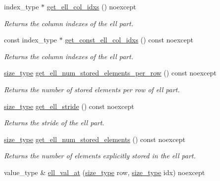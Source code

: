\begin{DoxyCompactItemize}
index\+\_\+type $\ast$ \hyperlink{classgko_1_1matrix_1_1Hybrid_ac46548ef106a6b8fe32219d3e11aab22}{get\+\_\+ell\+\_\+col\+\_\+idxs} () noexcept
\begin{DoxyCompactList}\small\item\em Returns the column indexes of the ell part. \end{DoxyCompactList}\item 
const index\+\_\+type $\ast$ \hyperlink{classgko_1_1matrix_1_1Hybrid_a7cba3bbddd3f2f921b65bcb8cd208df5}{get\+\_\+const\+\_\+ell\+\_\+col\+\_\+idxs} () const noexcept
\begin{DoxyCompactList}\small\item\em Returns the column indexes of the ell part. \end{DoxyCompactList}\item 
\hyperlink{namespacegko_a6e5c95df0ae4e47aab2f604a22d98ee7}{size\+\_\+type} \hyperlink{classgko_1_1matrix_1_1Hybrid_a9ac6d0efc8627c915c73a0155e64548d}{get\+\_\+ell\+\_\+num\+\_\+stored\+\_\+elements\+\_\+per\+\_\+row} () const noexcept
\begin{DoxyCompactList}\small\item\em Returns the number of stored elements per row of ell part. \end{DoxyCompactList}\item 
\hyperlink{namespacegko_a6e5c95df0ae4e47aab2f604a22d98ee7}{size\+\_\+type} \hyperlink{classgko_1_1matrix_1_1Hybrid_a2472495b537b47555a04aa6ba11d5817}{get\+\_\+ell\+\_\+stride} () const noexcept
\begin{DoxyCompactList}\small\item\em Returns the stride of the ell part. \end{DoxyCompactList}\item 
\hyperlink{namespacegko_a6e5c95df0ae4e47aab2f604a22d98ee7}{size\+\_\+type} \hyperlink{classgko_1_1matrix_1_1Hybrid_a99ab36f3aeae944db440a8bbe324aaff}{get\+\_\+ell\+\_\+num\+\_\+stored\+\_\+elements} () const noexcept
\begin{DoxyCompactList}\small\item\em Returns the number of elements explicitly stored in the ell part. \end{DoxyCompactList}\item 
value\+\_\+type \& \hyperlink{classgko_1_1matrix_1_1Hybrid_a5a0b57a9285424720218ff03dad6846c}{ell\+\_\+val\+\_\+at} (\hyperlink{namespacegko_a6e5c95df0ae4e47aab2f604a22d98ee7}{size\+\_\+type} row, \hyperlink{namespacegko_a6e5c95df0ae4e47aab2f604a22d98ee7}{size\+\_\+type} idx) noexcept

\end{DoxyCompactItemize}
